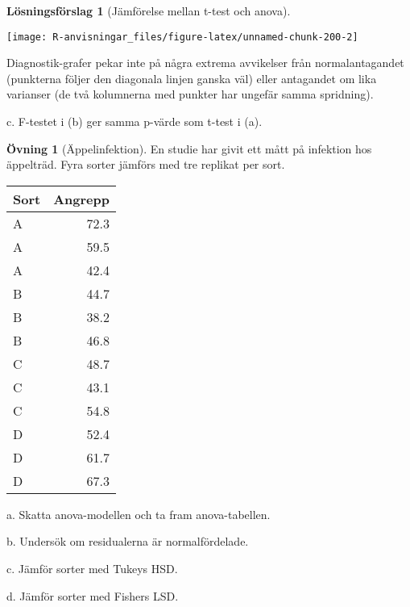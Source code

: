 \documentclass[
]{book}
\theoremstyle{definition}
\theoremstyle{definition}
\theoremstyle{definition}
\newtheorem{exercise}{Övning}[chapter]
\theoremstyle{definition}
\newtheorem{hypothesis}{Lösningsförslag}[chapter]
\theoremstyle{remark}
\begin{document}
\begin{hypothesis}[Jämförelse mellan t-test och anova]
\begin{center}\texttt{[image: R-anvisningar\_files/figure-latex/unnamed-chunk-200-2]} \end{center}

Diagnostik-grafer pekar inte på några extrema avvikelser från normalantagandet (punkterna följer den diagonala linjen ganska väl) eller antagandet om lika varianser (de två kolumnerna med punkter har ungefär samma spridning).

c. F-testet i (b) ger samma p-värde som t-test i (a).
\end{hypothesis}

\begin{exercise}[Äppelinfektion]
En studie har givit ett mått på infektion hos äppelträd. Fyra sorter jämförs med tre replikat per sort.

\begin{table}
\centering
\begin{tabular}[t]{lr}
\toprule
Sort & Angrepp\\
\midrule
A & 72.3\\
A & 59.5\\
A & 42.4\\
B & 44.7\\
B & 38.2\\
\addlinespace
B & 46.8\\
C & 48.7\\
C & 43.1\\
C & 54.8\\
D & 52.4\\
\addlinespace
D & 61.7\\
D & 67.3\\
\bottomrule
\end{tabular}
\end{table}

a. Skatta anova-modellen och ta fram anova-tabellen.

b. Undersök om residualerna är normalfördelade.

c. Jämför sorter med Tukeys HSD.

d. Jämför sorter med Fishers LSD.
\end{exercise}
\end{document}
